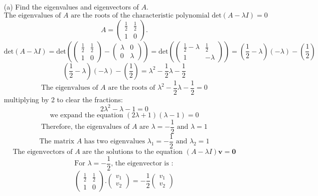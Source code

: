 \documentclass[a3paper,12pt]{extarticle} %
\begin{document}
\begin{enumerate}
    \begin{enumerate}
        \item[(a)] Find the eigenvalues and eigenvectors of \(A\).
        \[
            \text{The eigenvalues of } A \text{ are the roots of the characteristic polynomial } \text{det}(A - \lambda I) = 0
        \]
        \[
            A = \begin{pmatrix} \frac{1}{2} & \frac{1}{2} \\ 1 & 0 \end{pmatrix}.
        \]
        \[
            \text{det}(A - \lambda I) = \text{det}\left( \begin{pmatrix} \frac{1}{2} & \frac{1}{2} \\ 1 & 0 \end{pmatrix} - \begin{pmatrix} \lambda & 0 \\ 0 & \lambda \end{pmatrix} \right) = \text{det}\left( \begin{pmatrix} \frac{1}{2} - \lambda & \frac{1}{2} \\ 1 & -\lambda \end{pmatrix} \right) = \left( \frac{1}{2} - \lambda \right)(-\lambda) - \left( \frac{1}{2} \right)
        \]
        \[
            \left( \frac{1}{2} - \lambda \right)(-\lambda) - \left( \frac{1}{2} \right) = \lambda^2 - \frac{1}{2}\lambda - \frac{1}{2}
        \]
        \[
            \text{The eigenvalues of } A \text{ are the roots of } \lambda^2 - \frac{1}{2}\lambda - \frac{1}{2} = 0
        \]
        multiplying by 2 to clear the fractions:
        \[
            2\lambda^2 - \lambda - 1 = 0
        \]
        \[
            \text{we expand the equation } (2\lambda + 1)(\lambda - 1) = 0
        \]
        \[
            \text{Therefore, the eigenvalues of } A \text{ are } \lambda = -\frac{1}{2} \text{ and } \lambda = 1
        \]
        \[
            \text{The matrix } A \text{ has two eigenvalues } \lambda_1 = -\frac{1}{2} \text{ and } \lambda_2 = 1
        \]
        \[
            \text{The eigenvectors of } A \text{ are the solutions to the equation } (A - \lambda I)\mathbf{v} = \mathbf{0}
        \]
        \[
            \text{For } \lambda = -\frac{1}{2} \text{, the eigenvector is }:
        \]
        \[
            \begin{pmatrix} \frac{1}{2} & \frac{1}{2} \\ 1 & 0 \end{pmatrix}. \begin{pmatrix} v_1 \\ v_2 \end{pmatrix} = -\frac{1}{2} \begin{pmatrix} v_1 \\ v_2 \end{pmatrix}
\]
\end{enumerate}
\end{enumerate}
\end{document}
